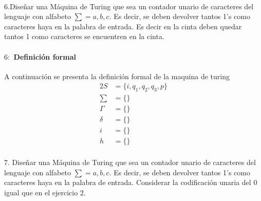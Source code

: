 \documentclass[10pt,a4paper]{book}
\begin{document}
{\paragraph{}6.Diseñar una Máquina de Turing que sea un contador unario de caracteres del lenguaje con alfabeto $\sum = {a,b,c}$. Es decir, se deben devolver tantos 1’s como caracteres haya en la palabra de entrada. Es decir en la cinta deben quedar tantos 1 como caracteres se encuentren en la cinta.\\[1cm]
\begin{figure*}[ht!]
	\centering
\end{figure*}
\paragraph{$6:$ Definición formal}A continuación se presenta la definición formal de la maquina de turing\\[0.2cm]
\begin{alignat*}{2}
	S&= \{i, q_1, q_2, q_3, p\}\\
	\textstyle \sum&= \{\}\\
	\Gamma&=\{\}\\
	\delta&=\{\}\\
	i&=\{\}\\
	h&=\{\}
\end{alignat*}
\newpage
\paragraph{}7. Diseñar una Máquina de Turing que sea un contador unario de caracteres del lenguaje con alfabeto $\sum = {a,b,c}$. Es decir, se deben devolver tantos 1’s como caracteres haya en la palabra de entrada. Considerar la codificación unaria del 0 igual que en el ejercicio 2.\\[1cm]
\begin{figure*}[ht!]
	\centering
\end{figure*}}
\end{document}
